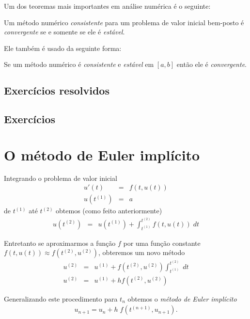 Um dos teoremas mais importantes em análise numérica é o seguinte:

\begin{teo}
Um método numérico \emph{consistente} para um problema de valor inicial bem-posto é \emph{convergente} se e somente se ele é \emph{estável}.
\end{teo}


Ele também é usado da seguinte forma:

\begin{teo}
Se um método numérico é \emph{consistente} e \emph{estável} em $[a,b]$ então ele é \emph{convergente}.
\end{teo}



\subsection*{Exercícios resolvidos}

\emconstrucao

\subsection*{Exercícios}

\emconstrucao


\section{O método de Euler implícito}
Integrando o problema de valor inicial
\begin{eqnarray}
  u'(t)  &=& f(t,u(t)) \\
  u(t^{(1)}) &=& a
\end{eqnarray}
de $t^{(1)}$ até $t^{(2)}$ obtemos (como feito anteriormente)
\begin{eqnarray}
  u(t^{(2)})      &=& u(t^{(1)}) +  \int_{t^{(1)}}^{t^{(2)}} f(t,u(t)) \; dt
\end{eqnarray}

Entretanto se aproximarmos a função $f$ por uma função constante $f(t,u(t)) \approx  f(t^{(2)},u^{(2)})$, obteremos um novo método
\begin{eqnarray}
  u^{(2)} &=&  u^{(1)} + f(t^{(2)},u^{(2)}) \int _{t^{(1)}}^{t^{(2)}}  \; dt \\
  u^{(2)} &=&  u^{(1)} + h f(t^{(2)},u^{(2)})
\end{eqnarray}


Generalizando este procedimento para $t_n$ obtemos o \emph{método de Euler implícito}
\begin{eqnarray}
u_{n+1}=u_n + h\;f(t^{(n+1)},u_{n+1}).
\end{eqnarray}

